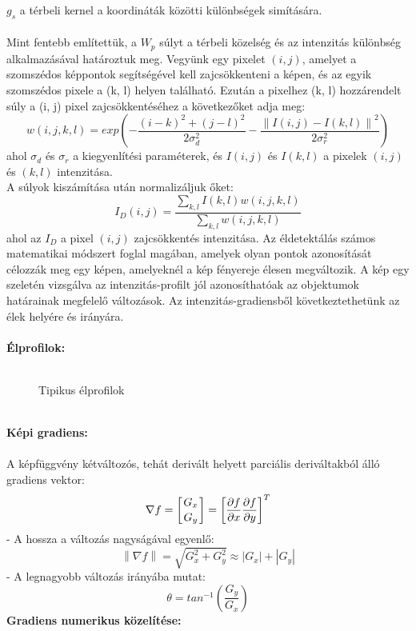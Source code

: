\indent$g_s$ a térbeli kernel a koordináták közötti különbségek simítására.\\
\\
Mint fentebb említettük, a $W_p$ súlyt a térbeli közelség és az intenzitás különbség alkalmazásával határoztuk meg. Vegyünk egy pixelet $(i, j)$, amelyet a szomszédos képpontok segítségével kell zajcsökkenteni a képen, és az egyik szomszédos pixele a (k, l) helyen található. Ezután a pixelhez (k, l) hozzárendelt súly a (i, j) pixel zajcsökkentéséhez a következőket adja meg:
$$w(i,j,k,l)=exp\left (-\frac{(i-k)^{2}+(j-l)^{2}}{2\sigma_{d}^{2}}-\frac{\left \| I(i,j)-I(k,l) \right \|^{2}}{2\sigma_{r}^{2}}  \right )$$
ahol $\sigma_d$ és $\sigma_r$ a kiegyenlítési paraméterek, és $I(i, j)$ és $I(k, l)$ a pixelek $(i, j)$ és $(k, l)$ intenzitása.
\\
A súlyok kiszámítása után normalizáljuk őket:
$$I_{D}(i,j)=\frac{\sum_{k,l}I(k,l)w(i,j,k,l)}{\sum_{k,l}w(i,j,k,l)}$$
ahol az $I_D$ a pixel $(i, j)$ zajcsökkentés intenzitása.
Az éldetektálás számos matematikai módszert foglal magában, amelyek olyan pontok azonosítását célozzák meg egy képen, amelyeknél a kép fényereje élesen megváltozik. A kép egy szeletén vizsgálva az intenzitás-profilt jól azonosíthatóak az objektumok határainak megfelelő változások. Az intenzitás-gradiensből következtethetünk az élek helyére és irányára.\\ \\
\textbf{Élprofilok:}\\ \\
\begin{figure}[ht]
\centering
{}
\caption{Tipikus élprofilok} 
\label{fig: elprofilok}
\end{figure}
\\
\textbf{Képi gradiens:}\\ \\
A képfüggvény kétváltozós, tehát derivált helyett parciális deriváltakból álló gradiens vektor: 
$$\nabla f = \left [ \genfrac{}{}{0pt}{}{G_x}{G_y} \right ]=\left [ \frac{\partial f}{\partial x} \frac{\partial f}{\partial y}  \right ]^{T}$$
\indent - A hossza a változás nagyságával egyenlő: 
$$ \left\| \nabla f \right \| = \sqrt{G_{x}^{2}+G_{y}^{2}} \approx \left | G_x  \right |+\left | G_y  \right | $$
\indent - A legnagyobb változás irányába mutat: 
$$\theta = tan^{-1}\left(\frac{G_y}{G_x}\right) $$
\textbf{Gradiens numerikus közelítése:}\\ \\
